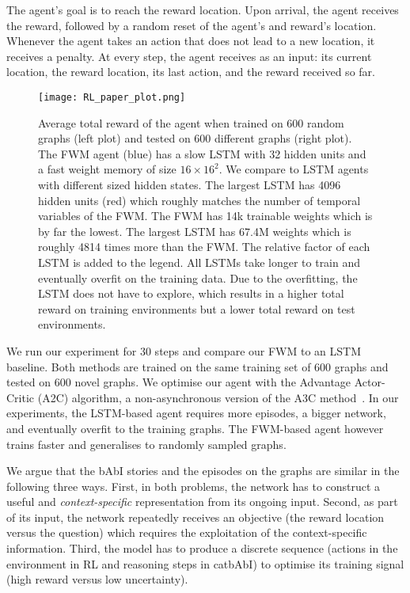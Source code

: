 \documentclass{article} \usepackage{iclr2021_conference,times}
\begin{document}
The agent's goal is to reach the reward location.
Upon arrival, the agent receives the reward, followed by a random reset of the agent's and reward's location.
Whenever the agent takes an action that does not lead to a new location, it receives a penalty.
At every step, the agent receives as an input: its current location, the reward location, its last action, and the reward received so far. 
\begin{figure}[h]
  \centering
\texttt{[image: RL\_paper\_plot.png]}
\caption{
  Average total reward of the agent when trained on 600 random graphs (left plot) and tested on 600 different graphs (right plot).
  The FWM agent (blue) has a slow LSTM with 32 hidden units and a fast weight memory of size $16 \times 16^2$. 
  We compare to LSTM agents with different sized hidden states. 
  The largest LSTM has 4096 hidden units (red) which roughly matches the number of temporal variables of the FWM.
  The FWM has 14k trainable weights which is by far the lowest. 
  The largest LSTM has 67.4M weights which is roughly 4814 times more than the FWM.
  The relative factor of each LSTM is added to the legend.
  All LSTMs take longer to train and eventually overfit on the training data. 
  Due to the overfitting, the LSTM does not have to explore, which results in a higher total reward on training environments but a lower total reward on test environments.}
  \label{fig:RL}
  \vspace{-5pt}
\end{figure}

We run our experiment for 30 steps and compare our FWM to an LSTM baseline. 
Both methods are trained on the same training set of 600 graphs and tested on 600 novel graphs.
We optimise our agent with the Advantage Actor-Critic (A2C) algorithm, a non-asynchronous version of the A3C method~\citep{mnih2016asynchronous}.
In our experiments, the LSTM-based agent requires more episodes, a bigger network, and eventually overfit to the training graphs.
The FWM-based agent however trains faster and generalises to randomly sampled graphs. 

We argue that the bAbI stories and the episodes on the graphs are similar in the following three ways. 
First, in both problems, the network has to construct a useful and \textit{context-specific} representation from its ongoing input. 
Second, as part of its input, the network repeatedly receives an objective (the reward location versus the question) which requires the exploitation of the context-specific information. 
Third, the model has to produce a discrete sequence (actions in the environment in RL and reasoning steps in catbAbI) to optimise its training signal (high reward versus low uncertainty).
\end{document}
